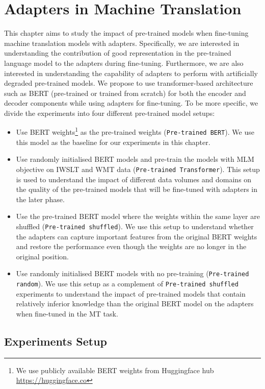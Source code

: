 
\chapter{Adapters in Machine Translation}
\label{chap:adaptmt}
This chapter aims to study the impact of pre-trained models when fine-tuning machine translation models with adapters. Specifically, we are interested in understanding the contribution of good representation in the pre-trained language model to the adapters during fine-tuning. Furthermore, we are also interested in understanding the capability of adapters to perform with artificially degraded pre-trained models. We propose to use transformer-based architecture such as BERT (pre-trained or trained from scratch) for both the encoder and decoder components while using adapters for fine-tuning. To be more specific, we divide the experiments into four different pre-trained model setups:
\begin{itemize}
    \item Use BERT weights\footnote{We use publicly available BERT weights from Huggingface hub \url{https://huggingface.co}} as the pre-trained weights (\texttt{Pre-trained BERT}). We use this model as the baseline for our experiments in this chapter.
    \item Use randomly initialised BERT models and pre-train the models with MLM objective on IWSLT and WMT data (\texttt{Pre-trained Transformer}). This setup is used to understand the impact of different data volumes and domains on the quality of the pre-trained models that will be fine-tuned with adapters in the later phase.
    \item Use the pre-trained BERT model where the weights within the same layer are shuffled (\texttt{Pre-trained shuffled}). We use this setup to understand whether the adapters can capture important features from the original BERT weights and restore the performance even though the weights are no longer in the original position.
    \item Use randomly initialised BERT models with no pre-training (\texttt{Pre-trained random}). We use this setup as a complement of \texttt{Pre-trained shuffled} experiments to understand the impact of pre-trained models that contain relatively inferior knowledge than the original BERT model on the adapters when fine-tuned in the MT task.
\end{itemize}

\section{Experiments Setup}
